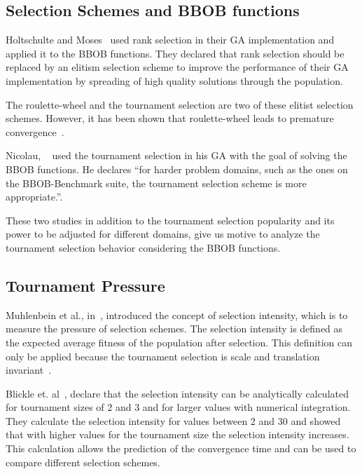 \subsection{Selection Schemes and BBOB functions}



Holtschulte and Moses~\cite{holtschulte2013benchmarking} used rank selection in their GA implementation and applied it to the BBOB functions. They declared that rank selection should be replaced by an elitism selection scheme to improve the performance of their GA implementation by spreading of high quality solutions through the population. 

The roulette-wheel and the tournament selection are two of these elitist selection schemes. However, it has been shown that roulette-wheel leads to premature convergence~\cite{baker1987reducing}. 

Nicolau, ~\cite{nicolau2009application} used the tournament selection in his GA with the goal of solving the BBOB functions. He declares ``for harder problem domains, such as the ones on the BBOB-Benchmark suite, the tournament selection scheme is more appropriate.''.

These two studies in addition to the tournament selection popularity and its power to be adjusted for different domains, give us motive to analyze the tournament selection behavior considering the BBOB functions.


\subsection{Tournament Pressure}\label{sec:background:tournament_pressure} 
Muhlenbein et al., in~\cite{muhlenbein1993predictive}, introduced the concept of selection intensity, which is to measure the pressure of selection schemes. The selection intensity is defined as the expected average fitness of the population after selection. This definition can only be applied because the tournament selection is scale and translation invariant~\cite{blickle1995mathematical}.

Blickle et. al~\cite{blickle1995mathematical}, declare that the selection intensity can be analytically calculated for tournament sizes of 2 and 3 and for larger values with numerical integration. They calculate the selection intensity for values between 2 and 30 and showed that with higher values for the tournament size the selection intensity increases. This calculation allows the prediction of the convergence time and can be used to compare different selection schemes.

